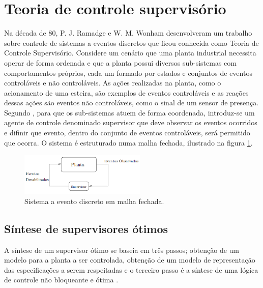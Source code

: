 \section{Teoria de controle supervis\'orio}
Na d\'ecada de 80, P. J. Ramadge e W. M. Wonham desenvolveram um trabalho sobre controle de sistemas a eventos discretos que ficou conhecida como Teoria de Controle Supervis\'orio. Considere um cen\'ario que uma planta industrial necessita operar de forma ordenada e que a planta possui diversos sub-sistemas com comportamentos pr\'oprios, cada um formado por estados e conjuntos de eventos control\'aveis e n\~ao control\'aveis. As a\c{c}\~oes realizadas na planta, como o acionamento de uma esteira, s\~ao exemplos de eventos control\'aveis e as rea\c{c}\~oes dessas a\c{c}\~oes s\~ao eventos n\~ao control\'aveis, como o sinal de um sensor de presen\c{c}a. Segundo \cite{apostilacury}, para que os sub-sistemas atuem de forma coordenada, introduz-se um agente de controle denominado supervisor que deve observar os eventos ocorridos e difinir que evento, dentro do conjunto de eventos control\'aveis, ser\'a permitido que ocorra. O sistema \'e estruturado numa malha fechada, ilustrado na figura \ref{fig:tcsmalhafechada}.

\begin{figure}[!htb]
	\caption[Sistema a evento discreto em malha fechada]{Sistema a evento discreto em malha fechada.}
	\label{fig:tcsmalhafechada}
	\includegraphics[width=6cm]{./figuras/TCS_EM_MALHA_FECHADA.png}\centering
\end{figure}



\subsection{S\'intese de supervisores \'otimos}
A s\'intese de um supervisor \'otimo se baseia em tr\^es passos; obten\c{c}\~ao de um modelo para a planta a ser controlada, obten\c{c}\~ao de um modelo de representa\c{c}\~ao das especifica\c{c}\~oes a serem respeitadas e o terceiro passo \'e a s\'intese de uma l\'ogica de controle n\~ao bloqueante e \'otima \cite{apostilacury}.

